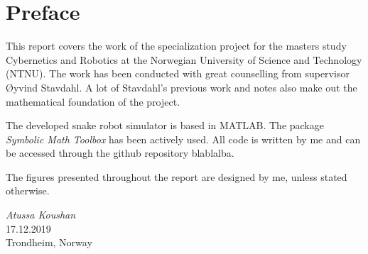 \chapter{Preface}

This report covers the work of the specialization project for the masters study Cybernetics and Robotics at the Norwegian University of Science and Technology (NTNU). 
The work has been conducted with great counselling from supervisor Øyvind Stavdahl. A lot of Stavdahl's previous work and notes also make out the mathematical foundation of the project. 

The developed snake robot simulator is based in MATLAB. The package \textit{Symbolic Math Toolbox} has been actively used. All code is written by me and can be accessed through the github repository blablalba.

The figures presented throughout the report are designed by me, unless stated otherwise.

\medskip
\begin {flushright}
  \textit{Atussa Koushan} \\
  \textsc {17.12.2019} \\
  Trondheim, Norway
\end {flushright}



\makeatletter
{}


\makeatother




